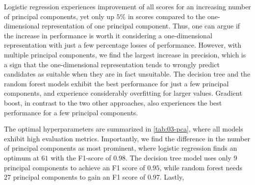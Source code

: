 Logistic regression experiences improvement of all scores for an increasing number of principal components, yet only up $5\%$ in scores compared to the one-dimensional representation of one principal component. Thus, one can argue if the increase in performance is worth it considering a one-dimensional representation with just a few percentage losses of performance. However, with multiple principal components, we find the largest increase in precision, which is a sign that the one-dimensional representation tends to wrongly predict candidates as suitable when they are in fact unsuitable. The decision tree and the random forest models exhibit the best performance for just a few principal components, and experience considerably overfitting for larger values. Gradient boost, in contrast to the two other approaches, also experiences the best performance for a few principal components.

\begin{table}[!ht]
\centering
\caption{A table of the optimal number of principal components and the respective scores (standard deviation) for the insightful approach, as visualized in the dash-dotted line in \autoref{fig:03-pca}.}
\label{tab:03-pca}
\noindent{}
\end{table}

The optimal hyperparameters are summarized in \autoref{tab:03-pca}, where all models exhibit high evaluation metrics. Importantly, we find the difference in the number of principal components as most prominent, where logistic regression finds an optimum at $61$ with the F1-score of $0.98$. The decision tree model uses only $9$ principal components to achieve an F1 score of $0.95$, while random forest needs $27$ principal components to gain an F1 score of $0.97$. Lastly,

